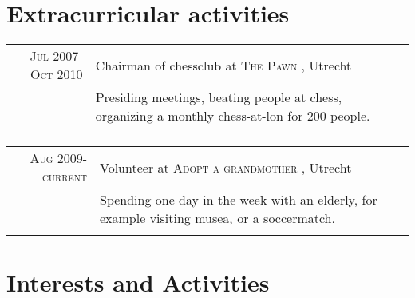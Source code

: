 \documentclass[a4paper,10pt]{article} %
\begin{document}
\newpage %



\section{Extracurricular activities}

\begin{tabular}{rl}
\textsc{
Jul 2007-Oct 2010 %
} & 
Chairman of chessclub %
 at \textsc{
The Pawn %
}, 
Utrecht  %
\emph{}\\
& \footnotesize{
Presiding meetings, beating people at chess, organizing a monthly chess-at-lon for 200 people. %
} \\
\multicolumn{2}{c}{} \\
\end{tabular}

\begin{tabular}{rl}
\textsc{
Aug 2009-current %
} & 
Volunteer %
 at \textsc{
Adopt a grandmother %
}, 
Utrecht  %
\emph{}\\
& \footnotesize{
Spending one day in the week with an elderly, for example visiting musea, or a
soccermatch. %
} \emph{}\\
\multicolumn{2}{c}{} \\
\end{tabular}


\section{Interests and Activities} %
\end{document}
